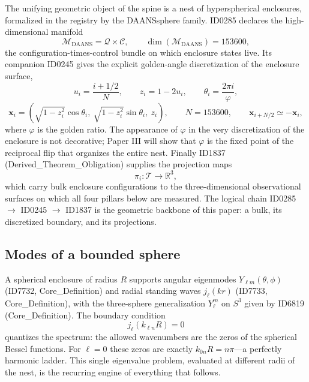 \documentclass[11pt]{article}
\theoremstyle{remark}
\begin{document}
The unifying geometric object of the spine is a nest of hyperspherical enclosures, formalized in the registry by the DAANSsphere family. ID0285 declares the high-dimensional manifold
\begin{equation}
\mathcal{M}_{\mathrm{DAANS}} = \mathcal{Q} \times \mathcal{C}, \qquad \dim(\mathcal{M}_{\mathrm{DAANS}}) = 153600,
\end{equation}
the configuration-times-control bundle on which enclosure states live. Its companion ID0245 gives the explicit golden-angle discretization of the enclosure surface,
\begin{equation}
u_i = \frac{i + 1/2}{N}, \qquad z_i = 1 - 2u_i, \qquad \theta_i = \frac{2\pi i}{\varphi},
\end{equation}
\begin{equation}
\mathbf{x}_i = \left( \sqrt{1 - z_i^2}\cos\theta_i,\ \sqrt{1 - z_i^2}\sin\theta_i,\ z_i \right), \qquad N = 153600, \qquad \mathbf{x}_{i+N/2} \simeq -\mathbf{x}_i,
\end{equation}
where $\varphi$ is the golden ratio. The appearance of $\varphi$ in the very discretization of the enclosure is not decorative; Paper III will show that $\varphi$ is the fixed point of the reciprocal flip that organizes the entire nest. Finally ID1837 (Derived\_Theorem\_Obligation) supplies the projection maps
\begin{equation}
\pi_i : \mathcal{T} \to \mathbb{R}^3,
\end{equation}
which carry bulk enclosure configurations to the three-dimensional observational surfaces on which all four pillars below are measured. The logical chain ID0285 $\to$ ID0245 $\to$ ID1837 is the geometric backbone of this paper: a bulk, its discretized boundary, and its projections.

\subsection{Modes of a bounded sphere}

A spherical enclosure of radius $R$ supports angular eigenmodes $Y_{\ell m}(\theta,\phi)$ (ID7732, Core\_Definition) and radial standing waves $j_\ell(kr)$ (ID7733, Core\_Definition), with the three-sphere generalization $Y_\ell^m$ on $S^3$ given by ID6819 (Core\_Definition). The boundary condition
\begin{equation}
j_\ell(k_{\ell n} R) = 0
\label{eq:besselzero}
\end{equation}
quantizes the spectrum: the allowed wavenumbers are the zeros of the spherical Bessel functions. For $\ell = 0$ these zeros are exactly $k_{0n}R = n\pi$---a perfectly harmonic ladder. This single eigenvalue problem, evaluated at different radii of the nest, is the recurring engine of everything that follows.
\end{document}

